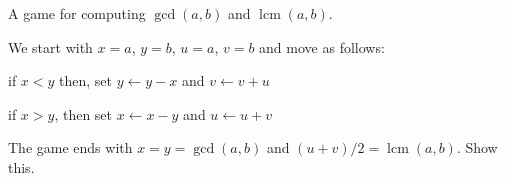 A game for computing $\gcd(a, b)$ and $\operatorname{lcm}(a, b)$.

We start with $x = a$, $y = b$, $u = a$, $v = b$ and move as follows:

if $x < y$ then, set $y \leftarrow y - x$ and $v \leftarrow v + u$

if $x > y$, then set $x \leftarrow x - y$ and $u \leftarrow u + v$

The game ends with $x = y = \gcd(a, b)$ and $(u + v)/2 = \operatorname{lcm}(a, b)$. Show this.
